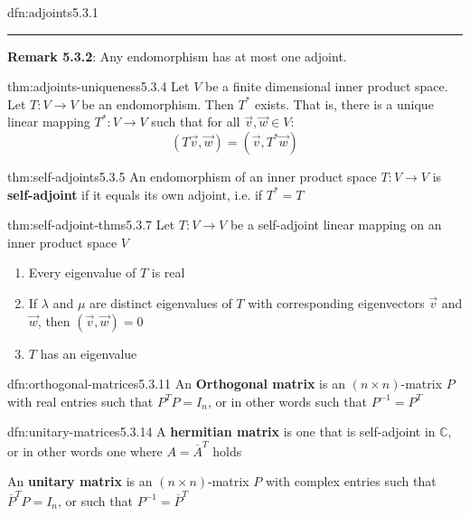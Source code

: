 \documentclass[landscape, 8pt]{extarticle}
\begin{document}
\begin{multicols}{3}
\begin{dfn}[Adjoints]{dfn:adjoints}{5.3.1}
    \noindent\rule{\textwidth}{0.2pt}
    \textbf{Remark 5.3.2}: Any endomorphism has at most one adjoint.
\end{dfn}

\begin{thm}[]{thm:adjoints-uniqueness}{5.3.4}
    Let $V$ be a finite dimensional inner product space. Let $T : V \to V$ be an endomorphism. Then $T^{*}$ exists. That is, there is a unique linear mapping $T^{*} : V \to V$ such that for all $\vec{v}, \vec{w}\in V$:
    \[(T \vec{v}, \vec{w}) = (\vec{v}, T^{*}\vec{w})\]
\end{thm}

\begin{dfn}{thm:self-adjoints}{5.3.5}
    An endomorphism of an inner product space $T : V \to V$ is \textbf{self-adjoint} if it equals its own adjoint, i.e. if $T^{*} = T$
\end{dfn}

\begin{thm}{thm:self-adjoint-thms}{5.3.7}
    Let $T : V\to V$ be a self-adjoint linear mapping on an inner product space $V$
    \begin{enumerate}
        \setlength\itemsep{0em}
        \item Every eigenvalue of $T$ is real
        \item If $\lambda$ and $\mu$ are distinct eigenvalues of $T$ with corresponding eigenvectors $\vec{v}$ and $\vec{w}$, then $(\vec{v}, \vec{w}) = 0$
        \item $T$ has an eigenvalue
    \end{enumerate}
\end{thm}

\begin{dfn}{dfn:orthogonal-matrices}{5.3.11}
    An \textbf{Orthogonal matrix} is an $(n \times n)$-matrix $P$ with real entries such that $P^{T}P = I_{n}$, or in other words such that $P^{-1} = P^{T}$
\end{dfn}

\begin{dfn}{dfn:unitary-matrices}{5.3.14}
    A \textbf{hermitian matrix} is one that is self-adjoint in $\mathbb{C}$, or in other words one where $A = \overline{A}^{T}$ holds


    An \textbf{unitary matrix} is an $(n \times n)$-matrix $P$ with complex entries such that $\overline{P}^{T}P = I_{n}$, or such that $P^{-1} = \overline{P}^{T}$
\end{dfn}
\newpage


\end{multicols}
\end{document}
